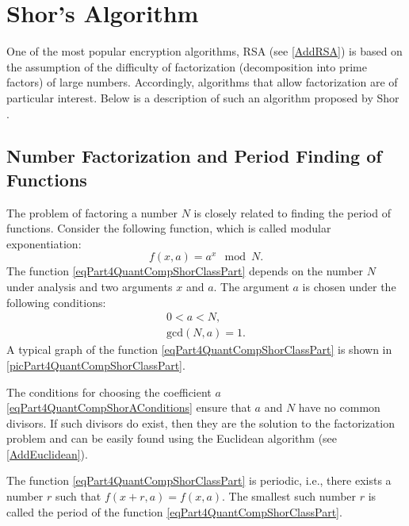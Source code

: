 \section{Shor's Algorithm}
\label{Part4QuantCompShor}
One of the most popular encryption algorithms, RSA (see 
\autoref{AddRSA}) 
is based on the assumption of the difficulty of factorization
(decomposition into prime factors) of large numbers. Accordingly,
algorithms that allow factorization
are of particular interest. Below is a description of such
an algorithm proposed by Shor \cite{bShor94}.

\subsection{Number Factorization and Period Finding of Functions}
\label{sec:part4:algoshor:periodfind}
The problem of factoring a number $N$ is closely related to finding the period
of functions. Consider the following function, which is called modular exponentiation:
\begin{equation}
f\left(x, a\right) = a^x \mod N.
\label{eqPart4QuantCompShorClassPart}
\end{equation}
The function \eqref{eqPart4QuantCompShorClassPart} depends on
the number $N$ under analysis and two arguments $x$ and $a$. The argument $a$
is chosen under the following conditions:
\begin{eqnarray}
0 < a < N,
\nonumber \\
\mbox{gcd}\left(N, a\right) = 1.
\label{eqPart4QuantCompShorAConditions}
\end{eqnarray}
A typical graph of the function \eqref{eqPart4QuantCompShorClassPart} is shown in
\autoref{picPart4QuantCompShorClassPart}.




The conditions for choosing the coefficient $a$
\eqref{eqPart4QuantCompShorAConditions} ensure that $a$ and $N$ have no
common divisors. If such divisors do exist, then they are the
solution to the factorization problem and can be easily found using
the Euclidean algorithm (see \autoref{AddEuclidean}).

The function \eqref{eqPart4QuantCompShorClassPart} is periodic,
i.e., there exists a number $r$ such that $f\left(x + r, a\right) = 
f\left(x, a\right)$. The smallest such number $r$ is called
the period of the function \eqref{eqPart4QuantCompShorClassPart}. 

